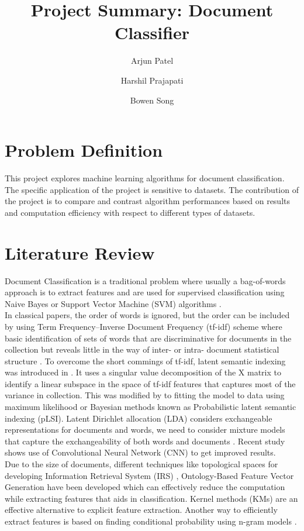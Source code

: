 \documentclass[a4paper, 11pt]{article}
\title{Project Summary: Document Classifier}
\author[1]{Arjun Patel}
\author[1]{Harshil Prajapati}
\author[1]{Bowen Song}
\affil[1]{Department of Electrical and Computer Engineering, Boston University}
\begin{document}
\maketitle
\section{Problem Definition}
This project explores machine learning algorithms for document classification. The specific application of the project is sensitive to datasets. The contribution of the project is to compare and contrast algorithm performances based on results and computation efficiency with respect to different types of datasets.

\section{Literature Review}
 Document Classification is a traditional problem where usually a bag-of-words approach is to extract features and are used for supervised classification using Naive Bayes or Support Vector Machine (SVM) algorithms \cite{sachan2018investigating}. \\

In classical papers, the order of words is ignored, but the order can be included by using Term Frequency–Inverse Document Frequency (tf-idf) scheme where basic identification of sets of words that are discriminative for documents in the collection but reveals little in the way of inter- or intra- document statistical structure \cite{maes1995agents}. To overcome the short commings of tf-idf, latent semantic indexing was introduced in \cite{deerwester1990indexing}. It uses a singular value decomposition of the X matrix to identify a linear subspace in the space of tf-idf features that captures most of the variance in collection. This was modified by \cite{hofmann1999probabilistic} to fitting the model to data using maximum likelihood or Bayesian methods known as Probabilistic latent semantic indexing (pLSI). Latent Dirichlet allocation (LDA) considers exchangeable representations for documents and words, we need to consider mixture models that capture the exchangeability of both words and documents \cite{blei2003latent}. Recent study shows use of Convolutional Neural Network (CNN) \cite{kim2014convolutional} to get improved results. \\

Due to the size of documents, different techniques like topological spaces for developing Information Retrieval System (IRS) \cite{parlak2018feature},  Ontology-Based Feature Vector Generation \cite{elhadad2018novel} have been developed which can effectively reduce the computation while extracting features that aids in classification. Kernel methods (KMs) are an effective alternative to explicit feature extraction. Another way to efficiently extract features is based on finding conditional probability using n-gram models \cite{furnkranz1998study} .\\
\end{document}
